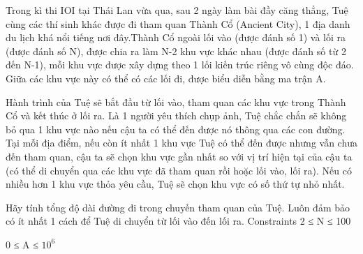 Trong kì thi IOI tại Thái Lan vừa qua, sau 2 ngày làm bài đầy căng thẳng, Tuệ cùng các thí sinh khác được đi tham quan Thành Cổ (Ancient City), 1 địa danh du lịch khá nổi tiếng nơi đây.Thành Cổ ngoài lối vào (được đánh số 1) và lối ra (được đánh số N), được chia ra làm N-2 khu vực khác nhau (được đánh số từ 2 đến N-1), mỗi khu vực được xây dựng theo 1 lối kiến trúc riêng vô cùng độc đáo. Giữa các khu vực này có thể có các lối đi, được biểu diễn bằng ma trận A.  

   Hành trình của Tuệ sẽ bắt đầu từ lối vào, tham quan các khu vực trong Thành Cổ và kết thúc ở lối ra. Là 1 người yêu thích chụp ảnh, Tuệ chắc chắn sẽ không bỏ qua 1 khu vực nào nếu cậu ta có thể đến được nó thông qua các con đường. Tại mỗi địa điểm, nếu còn ít nhất 1 khu vực Tuệ có thể đến được nhưng vẫn chưa đến tham quan, cậu ta sẽ chọn khu vực gần nhất so với vị trí hiện tại của cậu ta (có thể di chuyển qua các khu vực đã tham quan rồi hoặc lối vào, lối ra). Nếu có nhiều hơn 1 khu vực thỏa yêu cầu, Tuệ sẽ chọn khu vực có số thứ tự nhỏ nhất.  

   Hãy tính tổng độ dài đường đi trong chuyến tham quan của Tuệ. Luôn đảm bảo có ít nhất 1 cách để Tuệ di chuyển từ lối vào đến lối ra.
Constraints
2 ≤ N ≤ 100   


   0 ≤ A ≤ $10^{6}$